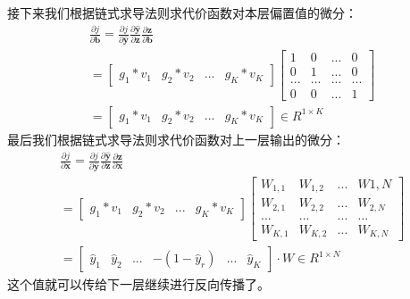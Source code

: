 \documentclass[UTF8]{article}
\begin{document}
接下来我们根据链式求导法则求代价函数对本层偏置值的微分：
\begin{equation}
\begin{aligned}
\frac{\partial{j}}{\partial{\boldsymbol{b}}}=\frac{\partial{j}}{\partial{\hat{\boldsymbol{y}}}} \frac{\partial{\hat{\boldsymbol{y}}}}{\partial{\boldsymbol{z}}} \frac{\partial{\boldsymbol{z}}}{\partial{\boldsymbol{b}}} \\
 =\begin{bmatrix}
 g_{1}*v_{1} & g_{2}*v_{2} & ... & g_{K}*v_{K}
 \end{bmatrix} \begin{bmatrix}
 1 & 0 & ... & 0 \\
 0 & 1 & ... & 0 \\
 ... & ... & ... & ... \\
 0 & 0 & ... & 1
 \end{bmatrix} \\ =\begin{bmatrix}
g_{1}*v_{1} & g_{2}*v_{2} & ... & g_{K}*v_{K}
\end{bmatrix} \in R^{1 \times K}
\end{aligned}
\label{mlp-leaky-relu-pj-pb-def}
\end{equation}
最后我们根据链式求导法则求代价函数对上一层输出的微分：
\begin{equation}
\begin{aligned}
\frac{\partial{j}}{\partial{\boldsymbol{x}}}=\frac{\partial{j}}{\partial{\hat{\boldsymbol{y}}}} \frac{\partial{\hat{\boldsymbol{y}}}}{\partial{\boldsymbol{z}}} \frac{\partial{\boldsymbol{z}}}{\partial{\boldsymbol{x}}} \\
 =\begin{bmatrix}
 g_{1}*v_{1} & g_{2}*v_{2} & ... & g_{K}*v_{K}
 \end{bmatrix} \begin{bmatrix}
 W_{1,1} & W_{1,2} & ... & W{1,N} \\
 W_{2,1} & W_{2,2} & ... & W_{2,N} \\
 ... & ... & ... & ... \\
 W_{K,1} & W_{K,2} & ... & W_{K,N}
 \end{bmatrix} \\
 =\begin{bmatrix}
 \hat{y}_{1} & \hat{y}_{2} & ... & -(1-\hat{y}_{r}) & ... & \hat{y}_{K}
 \end{bmatrix} \cdot W \in R^{1 \times N}
\end{aligned}
\label{mlp-leaky-relu-pj-px-def}
\end{equation}
这个值就可以传给下一层继续进行反向传播了。
\end{document}
